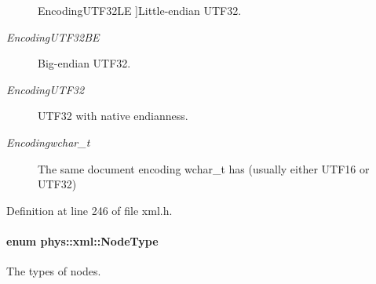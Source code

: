 \begin{Desc}
\begin{description}
{{EncodingUTF32LE}
\label{d9/d27/namespacephys_1_1xml_a420f5de782438f88160321385bea2015a127752883aaf8c9bdb5f66ec725211fc}
}]Little-\/endian UTF32. \item[{\em 
\hypertarget{namespacephys_1_1xml_a420f5de782438f88160321385bea2015a5fb13deaf1552b0f4c00e2b8cafce0b9}{
EncodingUTF32BE}
\label{d9/d27/namespacephys_1_1xml_a420f5de782438f88160321385bea2015a5fb13deaf1552b0f4c00e2b8cafce0b9}
}]Big-\/endian UTF32. \item[{\em 
\hypertarget{namespacephys_1_1xml_a420f5de782438f88160321385bea2015ac61c2f632bd66c2466c29783beb33f8a}{
EncodingUTF32}
\label{d9/d27/namespacephys_1_1xml_a420f5de782438f88160321385bea2015ac61c2f632bd66c2466c29783beb33f8a}
}]UTF32 with native endianness. \item[{\em 
\hypertarget{namespacephys_1_1xml_a420f5de782438f88160321385bea2015a2bc9c8d42796901c8feaa25e17c56cef}{
Encodingwchar\_\-t}
\label{d9/d27/namespacephys_1_1xml_a420f5de782438f88160321385bea2015a2bc9c8d42796901c8feaa25e17c56cef}
}]The same document encoding wchar\_\-t has (usually either UTF16 or UTF32) \end{description}
\end{Desc}



Definition at line 246 of file xml.h.

\hypertarget{namespacephys_1_1xml_a668b0cc666a9d49f7c7222a7552115d3}{
\paragraph[{NodeType}]{\setlength{\rightskip}{0pt plus 5cm}enum {\bf phys::xml::NodeType}}\hfill}
\label{d9/d27/namespacephys_1_1xml_a668b0cc666a9d49f7c7222a7552115d3}


The types of nodes. 

